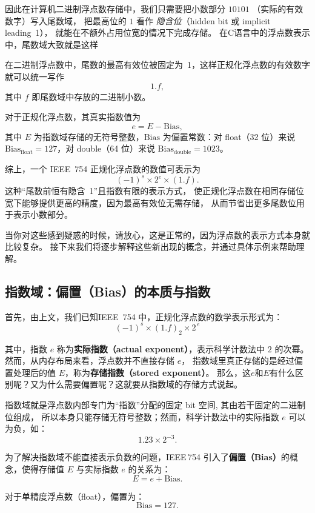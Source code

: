 因此在计算机二进制浮点数存储中，我们只需要把小数部分 $10101$ 
（实际的有效数字）写入尾数域，
把最高位的 $1$ 看作 \emph{隐含位}（hidden bit 或 implicit leading~1），
就能在不额外占用位宽的情况下完成存储。
在C语言中的浮点数表示中，尾数域大致就是这样


在二进制浮点数中，尾数的最高有效位被固定为~1，这样正规化浮点数的有效数字就可以统一写作
\[
1.f ,
\]
其中 $f$ 即尾数域中存放的二进制小数。

对于正规化浮点数，其真实指数值为
\[
e = E - \mathrm{Bias},
\]
其中 $E$ 为指数域存储的无符号整数，$\mathrm{Bias}$ 为偏置常数：对 float（32 位）来说 $\mathrm{Bias}_{\text{float}} = 127$，对 double（64 位）来说 $\mathrm{Bias}_{\text{double}} = 1023$。

综上，一个 IEEE~754 正规化浮点数的数值可表示为
\[
(-1)^s \times 2^e \times (1.f).
\]
这种“尾数前恒有隐含~1”且指数有限的表示方式，
使正规化浮点数在相同存储位宽下能够提供更高的精度，因为最高有效位无需存储，
从而节省出更多尾数位用于表示小数部分。











当你对这些感到疑惑的时候，请放心，这是正常的，因为浮点数的表示方式本身就比较复杂。
接下来我们将逐步解释这些新出现的概念，并通过具体示例来帮助理解。
\newpage
\subsection{指数域：偏置（Bias）的本质与指数}

首先，由上文，我们已知IEEE~754 中，正规化浮点数的数学表示形式为：
\[
(-1)^s \times (1.f)_2 \times 2^{\,e}
\]

其中，指数 $e$ 称为\textbf{实际指数（actual exponent）}，表示科学计数法中 $2$ 的次幂。
然而，从内存布局来看，浮点数并不直接存储 $e$，
指数域里真正存储的是经过偏置处理后的值 $E$，称为\textbf{存储指数（stored exponent）}。
那么，这$e$和$E$有什么区别呢？又为什么需要偏置呢？这就要从指数域的存储方式说起。


指数域就是浮点数内部专门为“指数”分配的固定 bit 空间,
其由若干固定的二进制位组成，
所以本身只能存储无符号整数；然而，科学计数法中的实际指数 $e$ 可以为负，如：
\[
1.23 \times 2^{-3}.
\]

为了解决指数域不能直接表示负数的问题，IEEE\,754 引入了\textbf{偏置（Bias）}的概念，使得存储值 $E$ 与实际指数 $e$ 的关系为：
\[
E = e + \mathrm{Bias}.
\]

对于单精度浮点数（float），偏置为：\[\mathrm{Bias} = 127.\]

